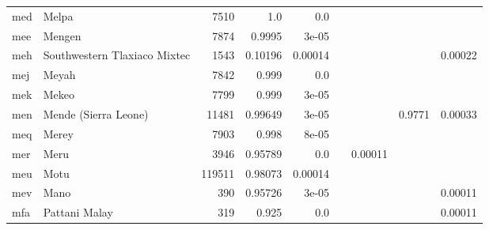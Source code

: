 \documentclass[11pt]{article}
\begin{document}
\begin{table*}[h]
{\begin{tabular}{llrrrrrrr}
med         & Melpa         & 7510         & 1.0         & 0.0         &          &          &          &          \\

mee         & Mengen         & 7874         & 0.9995         & 3e-05         &          &          &          &          \\

meh         & Southwestern Tlaxiaco Mixtec         & 1543         & 0.10196         & 0.00014         &          &          &          & 0.00022         \\

mej         & Meyah         & 7842         & 0.999         & 0.0         &          &          &          &          \\

mek         & Mekeo         & 7799         & 0.999         & 3e-05         &          &          &          &          \\

men         & Mende (Sierra Leone)         & 11481         & 0.99649         & 3e-05         &          &          & 0.9771         & 0.00033         \\

meq         & Merey         & 7903         & 0.998         & 8e-05         &          &          &          &          \\

mer         & Meru         & 3946         & 0.95789         & 0.0         &          & 0.00011         &          &          \\

meu         & Motu         & 119511         & 0.98073         & 0.00014         &          &          &          &          \\

mev         & Mano         & 390         & 0.95726         & 3e-05         &          &          &          & 0.00011         \\

mfa         & Pattani Malay         & 319         & 0.925         & 0.0         &          &          &          & 0.00011         \\


\end{tabular}}
\end{table*}
\end{document}
